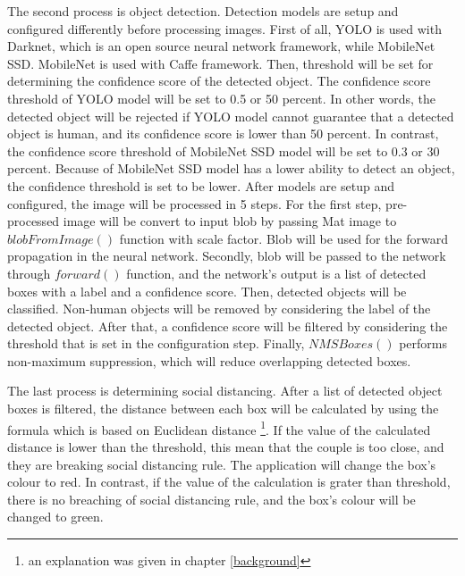         The second process is object detection.
        Detection models are setup and configured differently before processing images.
        First of all, YOLO is used with Darknet, which is an open source neural network framework,
            while MobileNet SSD. MobileNet is used with Caffe framework.
        Then, threshold will be set for determining the confidence score of the detected object.
            The confidence score threshold of YOLO model will be set to 0.5 or 50 percent.
            In other words, the detected object will be rejected if YOLO model cannot guarantee that a detected object is human,
            and its confidence score is lower than 50 percent.
            In contrast, the confidence score threshold of MobileNet SSD model will be set to 0.3 or 30 percent.
            Because of MobileNet SSD model has a lower ability to detect an object, the confidence threshold is set to be lower.
        After models are setup and configured, the image will be processed in 5 steps.
        For the first step, pre-processed image will be convert to input blob by passing Mat image to $blobFromImage()$ function with scale factor.
            Blob will be used for the forward propagation in the neural network.
        Secondly, blob will be passed to the network through $forward()$ function,
            and the network's output is a list of detected boxes with a label and a confidence score.
        Then, detected objects will be classified.
            Non-human objects will be removed by considering the label of the detected object.
        After that, a confidence score will be filtered by considering the threshold that is set in the configuration step.
        Finally, $NMSBoxes()$ performs non-maximum suppression, which will reduce overlapping detected boxes.

        The last process is determining social distancing.
        After a list of detected object boxes is filtered,
        the distance between each box will be calculated by using the formula which is based on Euclidean distance
        \footnote{an explanation was given in chapter \ref{background}}.
        If the value of the calculated distance is lower than the threshold,
        this mean that the couple is too close, and they are breaking social distancing rule.
        The application will change the box's colour to red.
        In contrast, if the value of the calculation is grater than threshold,
        there is no breaching of social distancing rule, and the box's colour will be changed to green.

